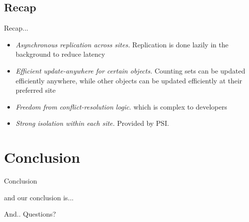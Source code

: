 \documentclass{beamer}
\begin{document}
	\subsection{Recap}
	\begin{frame}{Recap...}
	
		\begin{itemize}
		\item \textit{Asynchronous replication across sites.} Replication is done lazily in the background to reduce latency
		\item \textit{Efficient update-anywhere for certain objects.} Counting sets can be updated efficiently anywhere, while other objects can be updated efficiently at their preferred site
		\item \textit{Freedom from conflict-resolution logic}. which is complex to developers
		\item \textit{Strong isolation within each site.} Provided by PSI.
		\end{itemize}
	\end{frame}


\section{Conclusion}

\begin{frame}{Conclusion}

	and our conclusion is...

\end{frame}

\begin{frame}

	\begin{block}{And.. }
	Questions?
	\end{block}

\end{frame}
\end{document}
